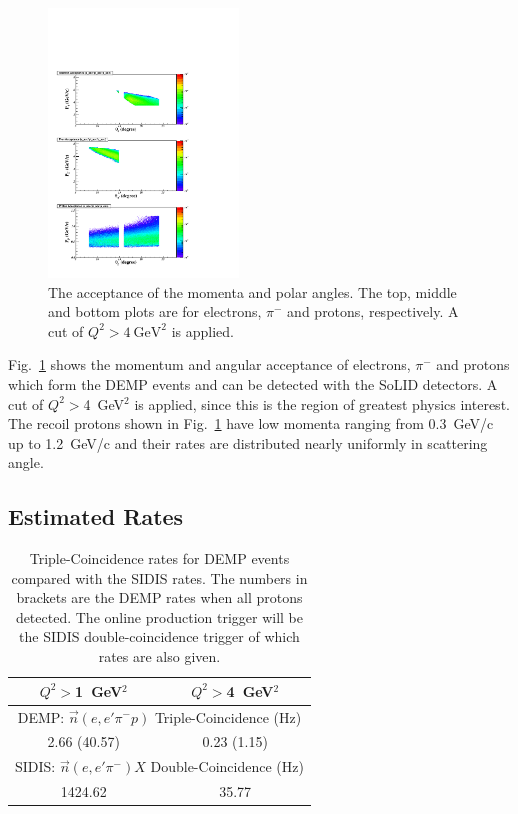 \begin{figure}[!ht]
 \begin{center}
   \includegraphics[type=pdf,
     ext=.pdf,read=.pdf,width=0.45\textwidth]{./figures/E11_acc_epip_Q2gt4}
   \caption[The acceptance of the momenta and scattering angles for electrons,
    $\pi^{-}$ and protons]{\footnotesize{The acceptance of the momenta and
polar angles. The top, middle and bottom plots are for electrons, $\pi^{-}$ and
protons, respectively. A cut of $Q^{2}>4~\mathrm{GeV^{2}}$ is applied.}}
  \label{p_theta}
  \end{center}
\end{figure}

Fig.~\ref{p_theta} shows the momentum and angular acceptance of electrons,
$\pi^{-}$ and protons which form the DEMP events and can be detected with the
SoLID detectors.  A cut of $Q^2>$4~GeV$^2$ is applied, since this is the region
of greatest physics interest.  The recoil
protons shown in Fig.~\ref{p_theta} have low momenta ranging from 0.3~GeV/c up
to 1.2~GeV/c and their rates are distributed nearly uniformly in scattering
angle.

\subsection{Estimated Rates
\label{sec:rates}}

\begin{table}[!ht]
\centering
\begin{tabular}{|c|c|}
 \hline
  $Q^2>$1~GeV$^2$ & $Q^2>$4~GeV$^2$\\
 \hline
\multicolumn{2}{|c|}{DEMP: $\vec{n}(e,e'\pi^{-}p)$ Triple-Coincidence (Hz)}\\
 \hline
 2.66 (40.57)   &  0.23 (1.15) \\
 \hline
\multicolumn{2}{|c|}{SIDIS: $\vec{n}(e,e'\pi^{-})X$ Double-Coincidence (Hz)}\\
 \hline
   1424.62  & 35.77   \\
 \hline
\end{tabular}
\caption[Triple-Coincidence rates for
  neutron-DEMP]{\footnotesize{Triple-Coincidence rates for DEMP events compared
    with the SIDIS rates. The numbers in brackets are the DEMP rates when all protons detected. The online production
    trigger will be the SIDIS double-coincidence trigger of which rates are
    also given.}}
\label{rate_table}
\end{table} 

